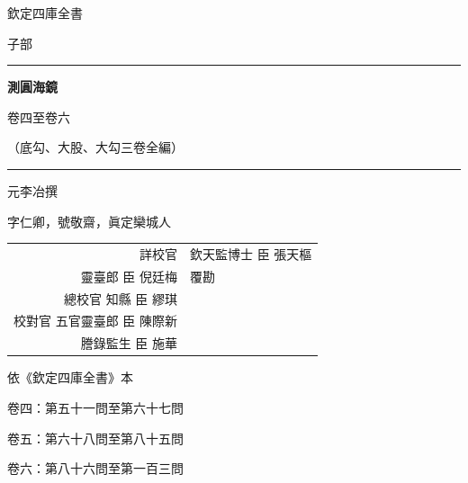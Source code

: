 \documentclass[11pt,a4paper]{article}
\begin{document}
\begin{titlepage}
\begin{center}
\vspace*{2cm}

{\fontsize{14}{18}\selectfont 欽定四庫全書}

\vspace{1.5cm}

{\fontsize{12}{16}\selectfont 子部}

\vspace{2cm}

\rule{0.8\textwidth}{1.5pt}

\vspace{1cm}

{\fontsize{28}{36}\selectfont\bfseries\color{titlecolor} 測圓海鏡}

\vspace{0.5cm}

{\fontsize{16}{22}\selectfont 卷四至卷六}

\vspace{0.3cm}

{\fontsize{12}{16}\selectfont\color{notecolor} （底勾、大股、大勾三卷全編）}

\vspace{1cm}

\rule{0.8\textwidth}{1.5pt}

\vspace{2cm}

{\fontsize{14}{18}\selectfont 元\quad 李冶\quad 撰}

\vspace{0.5cm}

{\fontsize{11}{15}\selectfont\color{notecolor} 字仁卿，號敬齋，眞定欒城人}

\vspace{3cm}

{\fontsize{11}{15}\selectfont\color{notecolor}
\begin{tabular}{rl}
詳校官 & 欽天監博士 臣 張天樞 \\
靈臺郎 臣 倪廷梅 & 覆勘 \\
總校官 知縣 臣 繆琪 & \\
校對官 五官靈臺郎 臣 陳際新 & \\
謄錄監生 臣 施華 & \\
\end{tabular}
}

\vfill

{\small 依《欽定四庫全書》本}

\vspace{0.3cm}

{\small\color{notecolor} 卷四：第五十一問至第六十七問}

{\small\color{notecolor} 卷五：第六十八問至第八十五問}

{\small\color{notecolor} 卷六：第八十六問至第一百三問}

\end{center}
\end{titlepage}
\end{document}
